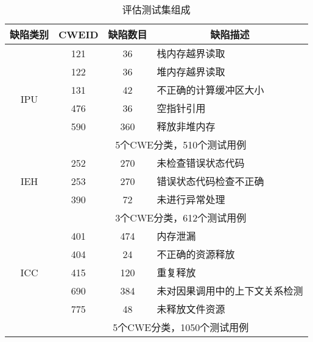 \begin{table}[t]
	\centering
	\begin{minipage}[t]{0.8\linewidth} %
		\caption{评估测试集组成}
		\label{tab:3-4-cwe}
		\begin{tabular}{cccl}
			\hline
			{缺陷类别 } & {CWEID} & 缺陷数目 & \multicolumn{1}{c}{缺陷描述} \\
			\hline
			\multirow{6}{*}{IPU} & 121 & 36 & 栈内存越界读取\\
			& 122 & 36 & 堆内存越界读取 \\
			& 131 & 42 & 不正确的计算缓冲区大小\\
			& 476 & 36 & 空指针引用\\
			& 590 & 360 & 释放非堆内存\\
			\cline{2-4} 
			& \multicolumn{3}{c}{5个CWE分类，510个测试用例} \\
			\hline
			\multirow{3}{*}{IEH} & 252 & 270 & 未检查错误状态代码\\
			& 253 & 270 & 错误状态代码检查不正确\\
			& 390 & 72 & 未进行异常处理\\
			\cline{2-4} 
			& \multicolumn{3}{c}{3个CWE分类，612个测试用例} \\
			\hline
			\multirow{5}{*}{ICC} & 401 & 474 & 内存泄漏\\
			& 404 & 24 & 不正确的资源释放\\
			& 415 & 120 & 重复释放\\
			& 690 & 384 & 未对因果调用中的上下文关系检测\\
			& 775 & 48 & 未释放文件资源\\
			\cline{2-4} 
			& \multicolumn{3}{c}{5个CWE分类，1050个测试用例} \\
			\hline
		\end{tabular}
	\end{minipage}
\end{table}
